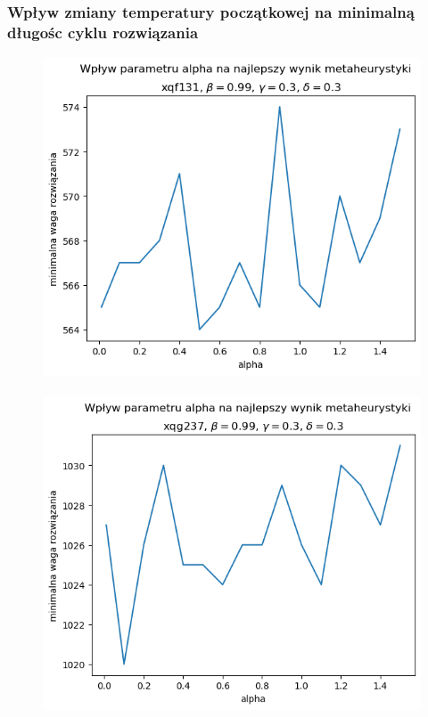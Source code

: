 \documentclass{article}
\begin{document}
\subsubsection{Wpływ zmiany temperatury początkowej na minimalną długośc cyklu rozwiązania}
    \begin{figure}[h!]
        \centering
        \includegraphics[height=9.5cm]{../../plots/sa-tuning-alpha-min-xqf131.png}
    \end{figure}

    \begin{figure}[h!]
        \centering
        \includegraphics[height=9.5cm]{../../plots/sa-tuning-alpha-min-xqg237.png}
    \end{figure}

\newpage
\end{document}
